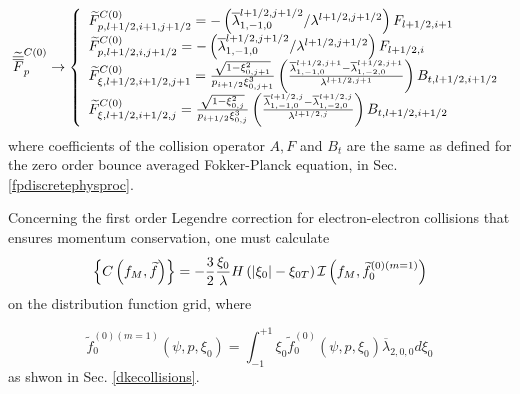 \begin{equation}
\widetilde{\overline{\overline{F}}}_{p}^{C\left( 0\right) }\rightarrow
\left\{
\begin{array}{l}
\widetilde{F}_{p,l+1/2,i+1,j+1/2}^{C\left( 0\right) }=-\left( \overline{%
\lambda }_{1,-1,0}^{l+1/2,j+1/2}/\lambda ^{l+1/2,j+1/2}\right) F_{l+1/2,i+1}
\\
\widetilde{F}_{p,l+1/2,i,j+1/2}^{C\left( 0\right) }=-\left( \overline{%
\lambda }_{1,-1,0}^{l+1/2,j+1/2}/\lambda ^{l+1/2,j+1/2}\right) F_{l+1/2,i}
\\
\widetilde{F}_{\xi ,l+1/2,i+1/2,j+1}^{C\left( 0\right) }=\frac{\sqrt{1-\xi
_{0,j+1}^{2}}}{p_{i+1/2}\xi _{0,j+1}^{3}}\left( \frac{\overline{\lambda }%
_{1,-1,0}^{l+1/2,j+1}-\overline{\lambda }_{1,-2,0}^{l+1/2,j+1}}{\lambda
^{l+1/2,j+1}}\right) B_{t,l+1/2,i+1/2} \\
\widetilde{F}_{\xi ,l+1/2,i+1/2,j}^{C\left( 0\right) }=\frac{\sqrt{1-\xi
_{0,j}^{2}}}{p_{i+1/2}\xi _{0,j}^{3}}\left( \frac{\overline{\lambda }%
_{1,-1,0}^{l+1/2,j}-\overline{\lambda }_{1,-2,0}^{l+1/2,j}}{\lambda
^{l+1/2,j}}\right) B_{t,l+1/2,i+1/2}
\end{array}
\right.
\end{equation}
where coefficients of the collision operator $A,F$ and $B_{t}$ are the same
as defined for the zero order bounce averaged Fokker-Planck equation, in
Sec. \ref{fpdiscretephysproc}.

Concerning the first order Legendre correction for
electron-electron collisions that ensures momentum conservation,
one must calculate
\[
\left\{
C\left( f_{M},\widetilde{f}\right) \right\} =-\frac{3}{2}\frac{\xi _{0}}{%
\lambda }H\left( \left| \xi _{0}\right| -\xi _{0T}\right)
\mathcal{I}\left( f_{M},\widetilde{f}_{0}^{\left( 0\right) \left(
m=1\right) }\right)
\]
on the distribution function grid, where

\begin{equation}
\widetilde{f}_{0}^{\left( 0\right) \left( m=1\right) }\left( \psi ,p,\xi
_{0}\right) =\int_{-1}^{+1}\xi _{0}\widetilde{f}_{0}^{\left( 0\right)
}\left( \psi ,p,\xi _{0}\right) \overline{\lambda }_{2,0,0}d\xi _{0}
\end{equation}
as shwon in Sec. \ref{dkecollisions}.

